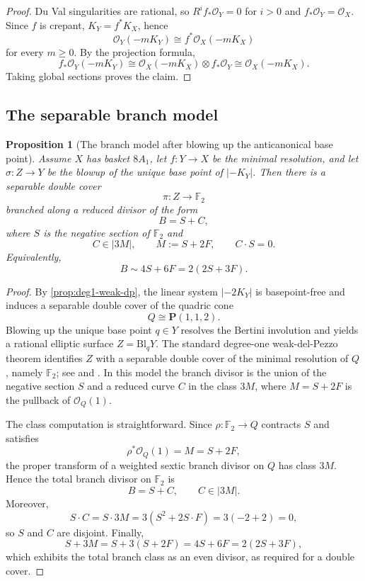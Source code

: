\documentclass[11pt]{article}
\newtheorem{proposition}[theorem]{Proposition}
\theoremstyle{definition}
\newcommand{\Bl}{\mathrm{Bl}}
\begin{document}
\begin{proof}
Du Val singularities are rational, so $R^if_*\mathcal O_Y=0$ for $i>0$ and $f_*\mathcal O_Y=\mathcal O_X$. Since $f$ is crepant, $K_Y=f^*K_X$, hence
\[
\mathcal O_Y(-mK_Y)\cong f^*\mathcal O_X(-mK_X)
\]
for every $m\ge 0$. By the projection formula,
\[
f_*\mathcal O_Y(-mK_Y)\cong \mathcal O_X(-mK_X)\otimes f_*\mathcal O_Y\cong \mathcal O_X(-mK_X).
\]
Taking global sections proves the claim.
\end{proof}

\subsection{The separable branch model}

\begin{proposition}[The branch model after blowing up the anticanonical base point]\label{prop:branch-model}
Assume $X$ has basket $8A_1$, let $f\colon Y\to X$ be the minimal resolution, and let $\sigma\colon Z\to Y$ be the blowup of the unique base point of $|-K_Y|$. Then there is a separable double cover
\[
\pi\colon Z\to \mathbb F_2
\]
branched along a reduced divisor of the form
\[
B=S+C,
\]
where $S$ is the negative section of $\mathbb F_2$ and
\[
C\in |3M|,\qquad M:=S+2F,
\qquad C\cdot S=0.
\]
Equivalently,
\[
B\sim 4S+6F=2(2S+3F).
\]
\end{proposition}

\begin{proof}
By \cref{prop:deg1-weak-dp}, the linear system $|-2K_Y|$ is basepoint-free and induces a separable double cover of the quadric cone
\[
Q\cong \mathbf P(1,1,2).
\]
Blowing up the unique base point $q\in Y$ resolves the Bertini involution and yields a rational elliptic surface $Z=\Bl_qY$. The standard degree-one weak-del-Pezzo theorem identifies $Z$ with a separable double cover of the minimal resolution of $Q$, namely $\mathbb F_2$; see \cite[Prop.~2.2 and Rem.~2.3]{AscherBejleri21} and \cite{HW81}. In this model the branch divisor is the union of the negative section $S$ and a reduced curve $C$ in the class $3M$, where $M=S+2F$ is the pullback of $\mathcal O_Q(1)$.

The class computation is straightforward. Since $\rho\colon \mathbb F_2\to Q$ contracts $S$ and satisfies
\[
\rho^*\mathcal O_Q(1)=M=S+2F,
\]
the proper transform of a weighted sextic branch divisor on $Q$ has class $3M$. Hence the total branch divisor on $\mathbb F_2$ is
\[
B=S+C,\qquad C\in |3M|.
\]
Moreover,
\[
S\cdot C = S\cdot 3M = 3(S^2+2S\cdot F)=3(-2+2)=0,
\]
so $S$ and $C$ are disjoint. Finally,
\[
S+3M = S+3(S+2F)=4S+6F=2(2S+3F),
\]
which exhibits the total branch class as an even divisor, as required for a double cover.
\end{proof}
\end{document}
